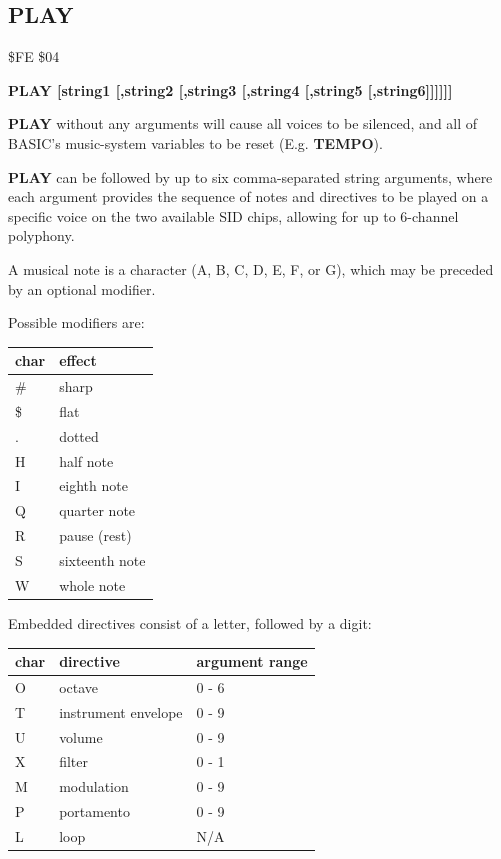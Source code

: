 \subsection{PLAY}
\begin{description}[leftmargin=2cm,style=nextline]
\item [Token:] \$FE \$04
\item [Format:] {\bf PLAY [string1 [,string2 [,string3 [,string4 [,string5 [,string6]]]]]]}
\item [Usage:] {\bf PLAY} without any arguments will cause all voices to be silenced,
               and all of BASIC's music-system variables to be reset (E.g. {\bf TEMPO}).

               {\bf PLAY} can be followed by up to six comma-separated string arguments,
               where each argument provides the sequence of notes and directives to be played on
               a specific voice on the two available SID chips, allowing for up to 6-channel polyphony.

               A musical note is a character (A, B, C, D, E, F, or G),
               which may be preceded by an optional modifier.

               Possible modifiers are:
\begin{center}
{\setlength{\tabcolsep}{1mm}
\ttfamily
\begin{tabular}{*{1}{|R{9mm}}|l|}
\hline
 char  & effect \\
\hline
 \# & sharp \\
 \$ & flat \\
  . & dotted \\
  H & half note \\
  I & eighth note \\
  Q & quarter note \\
  R & pause (rest) \\
  S & sixteenth note \\
  W & whole note \\
\hline
\end{tabular}
}
\end{center}

Embedded directives consist of a letter, followed by a digit:

\begin{center}
{\setlength{\tabcolsep}{1mm}
\ttfamily
\begin{tabular}{*{1}{|R{9mm}}|l|l|}
\hline
 char  & directive & argument range \\
\hline
  O & octave              & 0 - 6 \\
  T & instrument envelope & 0 - 9 \\
  U & volume              & 0 - 9 \\
  X & filter              & 0 - 1 \\
  M & modulation          & 0 - 9 \\
  P & portamento          & 0 - 9 \\
  L & loop                & N/A   \\
\hline
\end{tabular}
}
\end{center}


\end{description}

